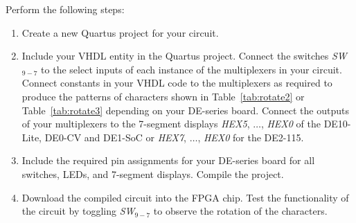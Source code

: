 \documentclass[epsfig,10pt,fullpage]{article}
\newcommand{\CommonDocsPath}{../../../common/docs}
\begin{document}
Perform the following steps:
\begin{enumerate}
\item Create a new Quartus  project for your circuit.
\item Include your VHDL entity in the Quartus  project. Connect the switches 
{\it SW}$_{9-7}$ to the select inputs of each instance of the 
multiplexers in your circuit. Connect constants in your VHDL code to the multiplexers 
as required to produce the patterns of characters shown in Table~\ref{tab:rotate2} or 
Table~\ref{tab:rotate3} depending on your DE-series board.
Connect the outputs of your multiplexers to the 7-segment displays {\it HEX5}, $\ldots$, 
{\it HEX0} of the DE10-Lite, DE0-CV and DE1-SoC or {\it HEX7}, $\ldots$, 
{\it HEX0} for the DE2-115.
\item Include the required pin assignments for your DE-series board for all switches, LEDs, 
and 7-segment displays. Compile the project.
\item Download the compiled circuit into the FPGA chip. Test the functionality of the 
circuit by toggling {\it SW}$_{9-7}$ to observe the rotation of the characters.
\end{enumerate}



\end{document}
